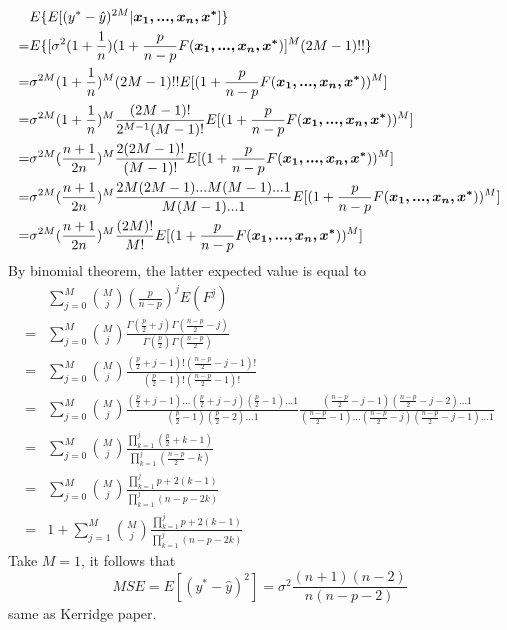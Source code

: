 \documentclass[11pt]{article}
\begin{document}
\begin{equation}
\begin{aligned}
&E\{E[(y^{*}-\hat{y})^{2M}|\boldsymbol{x_1,...,x_n,x^{*}}]\}\\
=&E\{[\sigma^{2}(1+\frac{1}{n})(1+\frac{p}{n-p}F(\boldsymbol{x_1,...,x_n,x^{*}})]\textbf{\emph{}}^{M}(2M-1)!!\}\\
=&\sigma^{2M}(1+\frac{1}{n})^{M}(2M-1)!!E[(1+\frac{p}{n-p}F(\boldsymbol{x_1,...,x_n,x^{*}}))^M]\\
=&\sigma^{2M}(1+\frac{1}{n})^{M}\frac{(2M-1)!}{2^{M-1}(M-1)!}E[(1+\frac{p}{n-p}F(\boldsymbol{x_1,...,x_n,x^{*}}))^M]\\
=&\sigma^{2M}(\frac{n+1}{2n})^{M}\frac{2(2M-1)!}{(M-1)!}E[(1+\frac{p}{n-p}F(\boldsymbol{x_1,...,x_n,x^{*}}))^M]\\
=&\sigma^{2M}(\frac{n+1}{2n})^{M}\frac{2M(2M-1)...M(M-1)...1}{M(M-1)...1}E[(1+\frac{p}{n-p}F(\boldsymbol{x_1,...,x_n,x^{*}}))^M]\\
=&\sigma^{2M}(\frac{n+1}{2n})^{M}\frac{(2M)!}{M!}E[(1+\frac{p}{n-p}F(\boldsymbol{x_1,...,x_n,x^{*}}))^M]
\end{aligned}
\end{equation}
By binomial theorem, the latter expected value is equal to  
\begin{equation}
\begin{aligned}
&\sum^{M}_{j=0}{M \choose j}(\frac{p}{n-p})^{j}E(F^{j})\\
=&\sum^{M}_{j=0}{M \choose j}\frac{\Gamma(\frac{p}{2}+j)\Gamma(\frac{n-p}{2}-j)}{\Gamma(\frac{p}{2})\Gamma(\frac{n-p}{2})}\\
=&\sum^{M}_{j=0}{M \choose j}\frac{(\frac{p}{2}+j-1)!(\frac{n-p}{2}-j-1)!}{(\frac{p}{2}-1)!(\frac{n-p}{2}-1)!}\\
=&\sum^{M}_{j=0}{M \choose j}\frac{(\frac{p}{2}+j-1)...(\frac{p}{2}+j-j)(\frac{p}{2}-1)...1}{(\frac{p}{2}-1)(\frac{p}{2}-2)...1}\frac{(\frac{n-p}{2}-j-1)(\frac{n-p}{2}-j-2)...1}{(\frac{n-p}{2}-1)...(\frac{n-p}{2}-j)(\frac{n-p}{2}-j-1)...1}\\
=&\sum^{M}_{j=0}{M\choose j}\frac{\prod^{j}_{k=1}(\frac{p}{2}+k-1)}{\prod^{j}_{k=1}(\frac{n-p}{2}-k)}\\
=&\sum^{M}_{j=0}{M\choose j}\frac{\prod^{j}_{k=1}p+2(k-1)}{\prod^{j}_{k=1}(n-p-2k)}\\
=&1+\sum^{M}_{j=1}{M\choose j}\frac{\prod^{j}_{k=1}p+2(k-1)}{\prod^{j}_{k=1}(n-p-2k)}
\end{aligned}
\end{equation}
Take $M=1$, it follows that $$MSE = E[(y^{*}-\hat{y})^{2}]=\sigma^{2}\frac{(n+1)(n-2)}{n(n-p-2)}$$same as Kerridge paper.
\end{document}
